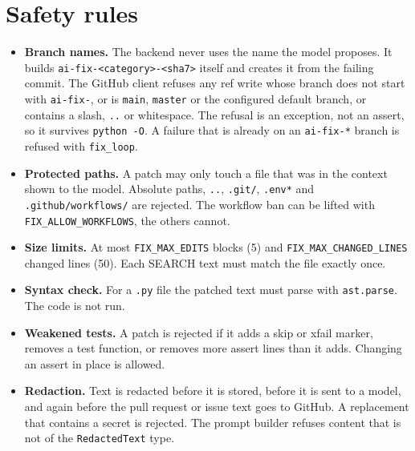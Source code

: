 \documentclass[11pt,a4paper]{report}
\begin{document}
\section{Safety rules}

\begin{itemize}[leftmargin=*,itemsep=2pt]
\item \textbf{Branch names.} The backend never uses the name the model proposes. It builds \texttt{ai-\allowbreak{}fix-\allowbreak{}\textless{}category\textgreater{}-\allowbreak{}\textless{}sha7\textgreater{}} itself and creates it from the failing commit. The GitHub client refuses any ref write whose branch does not start with \texttt{ai-\allowbreak{}fix-\allowbreak{}}, or is \texttt{main}, \texttt{master} or the configured default branch, or contains a slash, \texttt{.\allowbreak{}.\allowbreak{}} or whitespace. The refusal is an exception, not an assert, so it survives \texttt{python -\allowbreak{}O}. A failure that is already on an \texttt{ai-\allowbreak{}fix-\allowbreak{}*} branch is refused with \texttt{fix\_\allowbreak{}loop}.
\item \textbf{Protected paths.} A patch may only touch a file that was in the context shown to the model. Absolute paths, \texttt{.\allowbreak{}.\allowbreak{}}, \texttt{.\allowbreak{}git/\allowbreak{}}, \texttt{.\allowbreak{}env*} and \texttt{.\allowbreak{}github/\allowbreak{}workflows/\allowbreak{}} are rejected. The workflow ban can be lifted with \texttt{FIX\_\allowbreak{}ALLOW\_\allowbreak{}WORKFLOWS}, the others cannot.
\item \textbf{Size limits.} At most \texttt{FIX\_\allowbreak{}MAX\_\allowbreak{}EDITS} blocks (5) and \texttt{FIX\_\allowbreak{}MAX\_\allowbreak{}CHANGED\_\allowbreak{}LINES} changed lines (50). Each SEARCH text must match the file exactly once.
\item \textbf{Syntax check.} For a \texttt{.\allowbreak{}py} file the patched text must parse with \texttt{ast.\allowbreak{}parse}. The code is not run.
\item \textbf{Weakened tests.} A patch is rejected if it adds a skip or xfail marker, removes a test function, or removes more assert lines than it adds. Changing an assert in place is allowed.
\item \textbf{Redaction.} Text is redacted before it is stored, before it is sent to a model, and again before the pull request or issue text goes to GitHub. A replacement that contains a secret is rejected. The prompt builder refuses content that is not of the \texttt{RedactedText} type.

\end{itemize}
\end{document}
